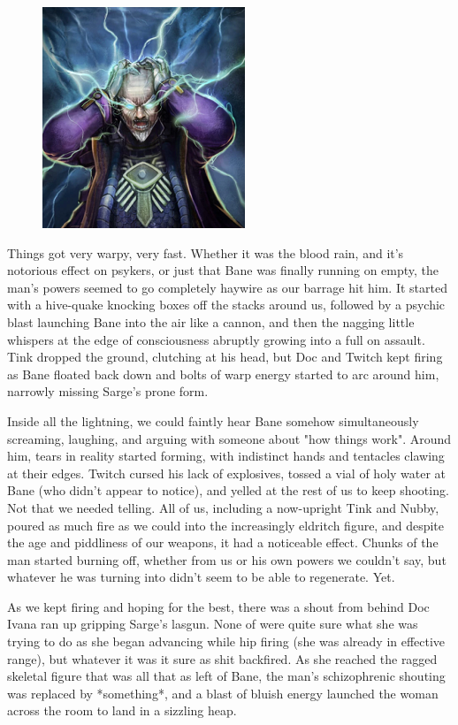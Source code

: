 \begin{figure}
	\begin{center}
		\includegraphics[width=\figwidth]{pics/19/55.png}
	\end{center}
\end{figure}
Things got very warpy, very fast. 
Whether it was the blood rain, and it's notorious effect on psykers, or just that Bane was finally running on empty, the man's powers seemed to go completely haywire as our barrage hit him. 
It started with a hive-quake knocking boxes off the stacks around us, followed by a psychic blast launching Bane into the air like a cannon, and then the nagging little whispers at the edge of consciousness abruptly growing into a full on assault. 
Tink dropped the ground, clutching at his head, but Doc and Twitch kept firing as Bane floated back down and bolts of warp energy started to arc around him, narrowly missing Sarge's prone form. 


Inside all the lightning, we could faintly hear Bane somehow simultaneously screaming, laughing, and arguing with someone about "how things work". 
Around him, tears in reality started forming, with indistinct hands and tentacles clawing at their edges. 
Twitch cursed his lack of explosives, tossed a vial of holy water at Bane (who didn't appear to notice), and yelled at the rest of us to keep shooting. 
Not that we needed telling. 
All of us, including a now-upright Tink and Nubby, poured as much fire as we could into the increasingly eldritch figure, and despite the age and piddliness of our weapons, it had a noticeable effect. 
Chunks of the man started burning off, whether from us or his own powers we couldn't say, but whatever he was turning into didn't seem to be able to regenerate. 
Yet.

As we kept firing and hoping for the best, there was a shout from behind Doc Ivana ran up gripping Sarge's lasgun. 
None of were quite sure what she was trying to do as she began advancing while hip firing (she was already in effective range), but whatever it was it sure as shit backfired. 
As she reached the ragged skeletal figure that was all that as left of Bane, the man's schizophrenic shouting was replaced by *something*, and a blast of bluish energy launched the woman across the room to land in a sizzling heap.

